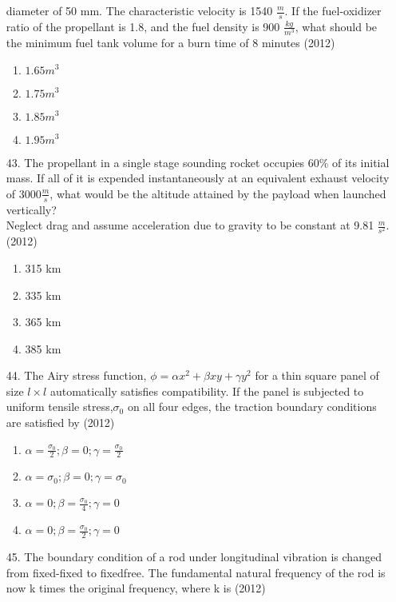 \documentclass[journal]{IEEEtran}
\begin{document}
\begin{enumerate}
    diameter of 50 mm. The characteristic velocity is 1540 $\frac{m}{s}$. If the fuel-oxidizer ratio of the
    propellant is 1.8, and the fuel density is 900 $\frac{kg}{m^3}$, what should be the minimum fuel tank volume
    for a burn time of 8 minutes \hfill (2012)
    \begin{enumerate}[label=(\Alph*)]
        \item $1.65m^3$
        \item $1.75m^3$
        \item $1.85m^3$
        \item $1.95m^3$
    \end{enumerate}
    \item[43.] The propellant in a single stage sounding rocket occupies 60\% of its initial mass. If all of it is
    expended instantaneously at an equivalent exhaust velocity of $3000\frac{m}{s}$, what would be the altitude
    attained by the payload when launched vertically?\\
    Neglect drag and assume acceleration due to gravity to be constant at 9.81 $\frac{m}{s^2}$. \hfill (2012)
    \begin{enumerate}[label=(\Alph*)]
        \item 315 km
        \item 335 km
        \item 365 km
        \item 385 km
    \end{enumerate}
    \item[44.] The Airy stress function, $\phi = \alpha x^2 + \beta xy + \gamma y^2$ for a thin square panel of size $l\times l$ automatically
    satisfies compatibility. If the panel is subjected to uniform tensile stress,$\sigma _0$ on all four edges, the
    traction boundary conditions are satisfied by \hfill (2012)
    \begin{enumerate}[label=(\Alph*)]
        \item $\alpha = \frac{\sigma_0}{2};\beta = 0;\gamma = \frac{\sigma_0}{2}$
        \item $\alpha = \sigma_0;\beta = 0;\gamma = \sigma_0$
        \item $\alpha = 0;\beta = \frac{\sigma_0}{4};\gamma = 0$
        \item $\alpha = 0;\beta = \frac{\sigma_0}{2};\gamma = 0$
    \end{enumerate}
    \item[45.] The boundary condition of a rod under longitudinal vibration is changed from fixed-fixed to fixedfree. The fundamental natural frequency of the rod is now k times the original frequency, where k is \hfill (2012)

\end{enumerate}
\end{document}
